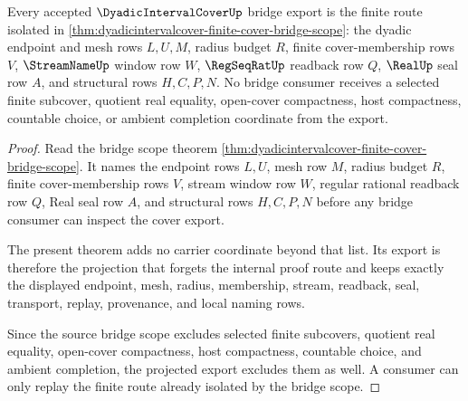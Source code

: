 \begin{theorem}
\label{thm:dyadic-interval-cover-bridge-export}
Every accepted $\DyadicIntervalCoverUp$ bridge export is the finite route isolated in \autoref{thm:dyadicintervalcover-finite-cover-bridge-scope}: the dyadic endpoint and mesh rows $L,U,M$, radius budget $R$, finite cover-membership rows $V$, $\StreamNameUp$ window row $W$, $\RegSeqRatUp$ readback row $Q$, $\RealUp$ seal row $A$, and structural rows $H,C,P,N$. No bridge consumer receives a selected finite subcover, quotient real equality, open-cover compactness, host compactness, countable choice, or ambient completion coordinate from the export.
\end{theorem}
\begin{proof}
Read the bridge scope theorem \autoref{thm:dyadicintervalcover-finite-cover-bridge-scope}. It names the endpoint rows $L,U$, mesh row $M$, radius budget $R$, finite cover-membership rows $V$, stream window row $W$, regular rational readback row $Q$, Real seal row $A$, and structural rows $H,C,P,N$ before any bridge consumer can inspect the cover export.

The present theorem adds no carrier coordinate beyond that list. Its export is therefore the projection that forgets the internal proof route and keeps exactly the displayed endpoint, mesh, radius, membership, stream, readback, seal, transport, replay, provenance, and local naming rows.

Since the source bridge scope excludes selected finite subcovers, quotient real equality, open-cover compactness, host compactness, countable choice, and ambient completion, the projected export excludes them as well. A consumer can only replay the finite route already isolated by the bridge scope.
\end{proof}

